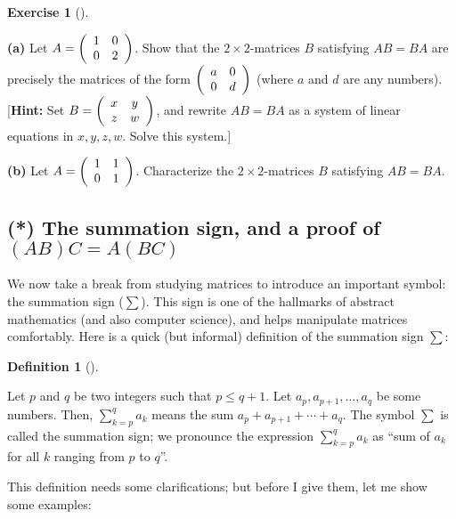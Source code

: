 \documentclass[numbers=enddot,12pt,final,onecolumn,notitlepage]{scrartcl}%
\theoremstyle{definition}
\newtheorem{defi}[theo]{Definition}
\newenvironment{definition}[1][]
{\begin{defi}[#1]\begin{leftbar}}
{\end{leftbar}\end{defi}}
\newtheorem{exmp}[theo]{Exercise}
\newenvironment{exercise}[1][]
{\begin{exmp}[#1]\begin{leftbar}}
{\end{leftbar}\end{exmp}}
\let\sumnonlimits\sum
\renewcommand{\sum}{\sumnonlimits\limits}
\begin{document}
\begin{exercise}
\label{exe.commutativity-example}\textbf{(a)} Let $A=\left(
\begin{array}
[c]{cc}%
1 & 0\\
0 & 2
\end{array}
\right)  $. Show that the $2\times2$-matrices $B$ satisfying $AB=BA$ are
precisely the matrices of the form $\left(
\begin{array}
[c]{cc}%
a & 0\\
0 & d
\end{array}
\right)  $ (where $a$ and $d$ are any numbers). [\textbf{Hint:} Set $B=\left(
%
\begin{array}
[c]{cc}%
x & y\\
z & w
\end{array}
\right)  $, and rewrite $AB=BA$ as a system of linear equations in $x,y,z,w$.
Solve this system.]

\textbf{(b)} Let $A=\left(
\begin{array}
[c]{cc}%
1 & 1\\
0 & 1
\end{array}
\right)  $. Characterize the $2\times2$-matrices $B$ satisfying $AB=BA$.
\end{exercise}

\subsection{\label{sect.intro.sum}(*) The summation sign, and a proof of
$\left(  AB\right)  C=A\left(  BC\right)  $}

We now take a break from studying matrices to introduce an important symbol:
the summation sign ($\sum$). This sign is one of the hallmarks of abstract
mathematics (and also computer science), and helps manipulate matrices
comfortably. Here is a quick (but informal) definition of the summation sign
$\sum$:

\begin{definition}
\label{def.sum}Let $p$ and $q$ be two integers such that $p\leq q+1$. Let
$a_{p},a_{p+1},\ldots,a_{q}$ be some numbers. Then, $\sum_{k=p}^{q}a_{k}$
means the sum $a_{p}+a_{p+1}+\cdots+a_{q}$. The symbol $\sum$ is called the
summation sign; we pronounce the expression $\sum_{k=p}^{q}a_{k}$ as
\textquotedblleft sum of $a_{k}$ for all $k$ ranging from $p$ to
$q$\textquotedblright.
\end{definition}

This definition needs some clarifications; but before I give them, let me show
some examples:
\end{document}
